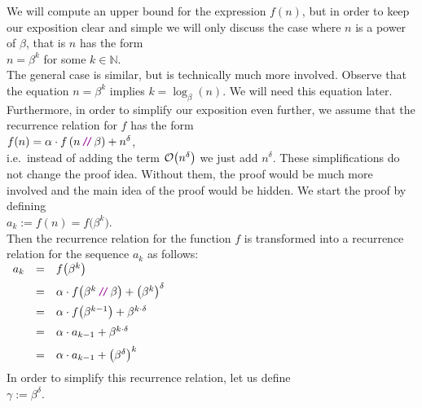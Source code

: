 \proof
We will compute an upper bound for the expression $f(n)$, but in order to keep our exposition clear
and simple we will only discuss the case where $n$ is a power of $\beta$, that is $n$ has the form
\\[0.2cm]
\hspace*{1.3cm}
$n = \beta^k$ \quad for some $k \in \mathbb{N}$.
\\[0.2cm]
The general case is similar, but is technically much more involved.
Observe that the equation $n = \beta^k$ implies $k = \log_{\beta}(n)$.  We will need this equation later. 
Furthermore, in order to simplify our exposition even further, we assume that the recurrence
relation for $f$ has the form 
\\[0.2cm]
\hspace*{1.3cm}
 $f(n) = \alpha \cdot f\left(n \dv \beta\right) + n^\delta$,
\\[0.2cm]
i.e.~instead of adding the term $\mathcal{O}\bigl(n^\delta\bigr)$ we just add $n^\delta$.  These
simplifications do not change the proof idea.  Without them, the proof would be much more involved and the main
idea of the proof would be hidden.  We start the proof by defining
\\[0.2cm]
\hspace*{1.3cm}
 $a_k := f(n) = f\bigl(\beta^k\bigr)$.  
\\[0.2cm]
Then the recurrence relation for the function $f$
is transformed into a recurrence relation for the sequence $a_k$ as follows:
\\[0.2cm]
\hspace*{1.3cm}
$
\begin{array}[t]{lcl}
a_k & = & f\bigl(\beta^{k}\bigr)                                             \\[0.2cm]
    & = & \alpha \cdot f\bigl(\beta^{k} \dv \beta\bigr) + \bigl(\beta^{k}\bigr)^\delta    \\[0.2cm]
    & = & \alpha \cdot f\bigl(\beta^{k-1}\bigr) + \beta^{k \cdot \delta}    \\[0.2cm]
    & = & \alpha \cdot a_{k-1} + \beta^{k \cdot \delta}    \\[0.2cm]
    & = & \alpha \cdot a_{k-1} + \bigl(\beta^{\delta}\bigr)^k    \\[0.2cm]
\end{array}
$
\\[0.2cm]
In order to simplify this recurrence relation, let us define
\\[0.2cm]
\hspace*{1.3cm}
$\gamma := \beta^{\delta}$.
